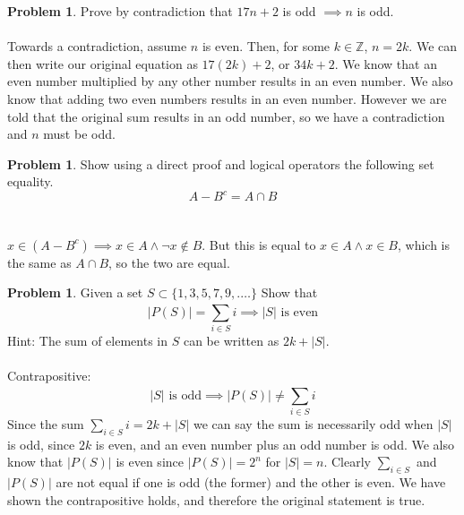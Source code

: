 \documentclass[10pt,leqno ]{article}
\theoremstyle{definition}
\newtheorem{problem}[theorem]{Problem}
\begin{document}
\begin{problem} Prove by contradiction that $17n + 2$ is odd $\implies n$ is odd.
\\\\
\Large
Towards a contradiction, assume $n$ is even.  Then, for some $k \in \mathbb{Z}$, $n = 2k$.  We can then write our original equation as $17(2k) + 2$, or $34k + 2$.  We know that an even number multiplied by any other number results in an even number.  We also know that adding two even numbers results in an even number.  However we are told that the original sum results in an odd number, so  we have a contradiction and $n$ must be odd.
\end{problem}
\newpage


\begin{problem} Show using a direct proof and logical operators the following set equality.
$$A - B^c = A \cap B$$
\\\\
\Large
$x \in (A - B^c) \implies x \in A \wedge \neg x \notin B$.  But this is equal to $x \in A \wedge x \in B$, which is the same as $A \cap B$, so the two are equal.
\end{problem}
\newpage


\begin{problem} Given a set $S \subset \{1, 3, 5, 7, 9, .\dots \}$ Show that
$$ |P(S)| =  \sum_{i \in S}^{}i \implies |S| \text{ is even}$$
Hint:  The sum of elements in $S$ can be written as $2k+|S|$.
\\\\
\Large
Contrapositive:
$$|S| \text{ is odd} \implies |P(S)| \neq \sum_{i \in S}^{}i$$
Since the sum $\sum_{i \in S}^{}i = 2k + |S|$ we can say the sum is necessarily odd when $|S|$ is odd, since $2k$ is even, and an even number plus an odd number is odd.  We also know that $|P(S)|$ is even since $|P(S)| = 2^n$ for $|S| = n$.  Clearly $\sum_{i \in S}^{}$ and $|P(S)|$ are not equal if one is odd (the former) and the other is even.  We have shown the contrapositive holds, and therefore the original statement is true.
\end{problem}
\newpage
\end{document}
